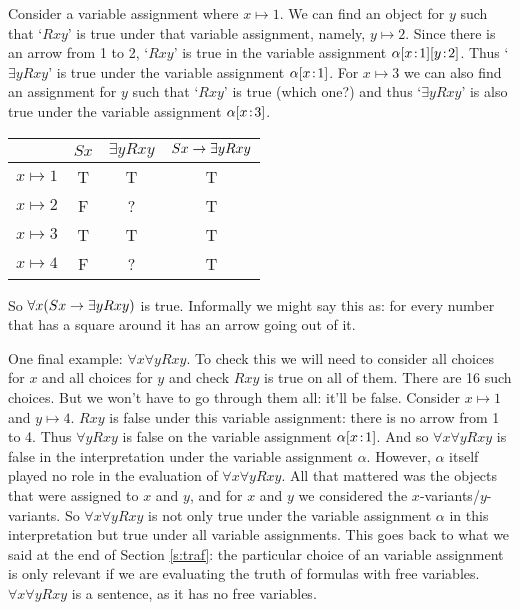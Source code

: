 Consider a variable assignment where $x\mapsto 1$. We can find an object for $y$ such that `$Rxy$' is true under that variable assignment, namely, $y\mapsto 2$. Since there is an arrow from 1 to 2, `$Rxy$' is true in the variable assignment $\alpha[x \!:\! 1][y \!:\! 2]$. Thus `$\exists y Rxy$' is true under the variable assignment $\alpha[x \!:\! 1]$. For $x\mapsto 3$ we can also find an assignment for $y$ such that `$Rxy$' is true (which one?) and thus  `$\exists y Rxy$' is also true under the variable assignment $\alpha[x \!:\! 3]$.
\begin{center}
\begin{tabular}{c|ccc}
&$Sx$&$\exists y Rxy$&$Sx\rightarrow\exists y Rxy$\Bstrut\\\hline\Tstrut
$x\mapsto 1$&T&T&T\\
$x\mapsto 2$&F&?&T\\
$x\mapsto 3$&T&T&T\\
$x\mapsto 4$&F&?&T
\end{tabular}
\end{center}So $\forall x(Sx\rightarrow \exists y Rxy)$ is true. Informally we might say this as: for every number that has a square around it has an arrow going out of it.

One final example: $\forall x\forall y Rxy$. To check this we will need to consider all choices for $x$ and all choices for $y$ and check $Rxy$ is true on all of them. There are 16 such choices. But we won't have to go through them all: it'll be false. Consider $x\mapsto 1$ and $y\mapsto 4$. $Rxy$ is false under this variable assignment: there is no arrow from 1 to 4. Thus $\forall yRxy$ is false on the variable assignment $\alpha[x \!:\! 1]$. And so $\forall x\forall y Rxy$ is false in the interpretation under the variable assignment $\alpha$. However, $\alpha$ itself played no role in the evaluation of $\forall x\forall y Rxy$. All that mattered was the objects that were assigned to $x$ and $y$, and for $x$ and $y$ we considered the $x$-variants/$y$-variants. So $\forall x\forall y Rxy$ is not only true under the variable assignment $\alpha$ in this interpretation but true under all variable assignments. This goes back to what we said at the end of Section \ref{s:traf}: the particular choice of an variable assignment is only relevant if we are evaluating the truth of formulas with free variables. $\forall x\forall y Rxy$ is a sentence, as it has no free variables.

